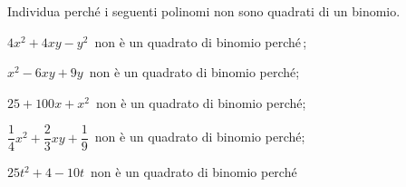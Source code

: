 \begin{esercizio}
\label{ese:16.8}
Individua perché i seguenti polinomi non sono quadrati di un binomio.
\begin{enumeratea}
 \item $4x^{2}+4xy-y^{2}$\, non è un quadrato di binomio perché\,\dotfill;
 \item $x^{2}-6xy+9y$\, non è un quadrato di binomio perché\dotfill;
 \item $25+100x+x^{2}$\, non è un quadrato di binomio perché\dotfill;
 \item $\dfrac{1}{4}x^{2}+\dfrac{2}{3}xy+\dfrac{1}{9}$\, non è un quadrato di binomio perché\dotfill;
 \item $25t^{2}+4-10t$\, non è un quadrato di binomio perché\dotfill%
\end{enumeratea}
\end{esercizio}

